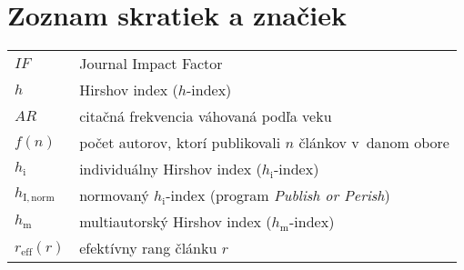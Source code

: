 \chapter*{Zoznam skratiek a značiek}

\begin{flushleft}
  \begin{longtable}[l]{ll} %
    $IF$              & Journal Impact Factor \\[1mm]
    $h$               & Hirshov index ($h$-index) \\[1mm]
    $AR$              & citačná frekvencia váhovaná podľa veku \\[1mm]
    $f(n)$            & počet autorov, ktorí publikovali $n$ článkov v~danom obore \\[1mm]
    $h_{\mathrm{i}}$       & individuálny Hirshov index ($h_{\mathrm{i}}$-index)  \\[1mm]
    $h_{\mathrm{I, norm}}$  & normovaný $h_{\mathrm{i}}$-index (program {\em Publish or Perish})\\[1mm]
    $h_{\mathrm{m}}$       & multiautorský Hirshov index ($h_{\mathrm{m}}$-index) \\[1mm]
    $r_{\mathrm{eff}}(r)$  & efektívny rang článku $r$\\[1mm]
  \end{longtable}
\end{flushleft}


